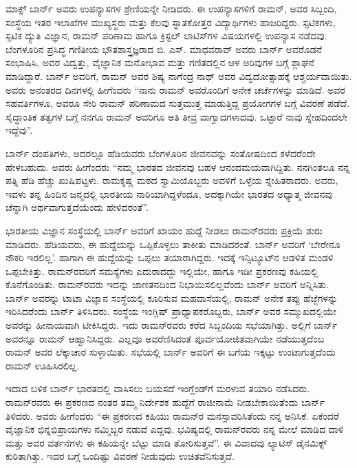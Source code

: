 ಮಾಕ್ಸ್ ಬಾರ್ನ್ ಅವರು ಉಪನ್ಯಾಸಗಳ ಶ್ರೇಣಿಯನ್ನೇ ನೀಡಿದರು. ಈ ಉಪನ್ಯಾಸಗಳಿಗೆ ರಾಮನ್, ಅವರ ಸಿಬ್ಬಂದಿ, ಸಂಸ್ಥೆಯ ಇತರ ಇಲಾಖೆಗಳ ಮುಖ್ಯಸ್ಥರು ಮತ್ತು ಕೆಲವು ಸ್ನಾತಕೋತ್ತರ ವಿದ್ಯಾರ್ಥಿಗಳು ಹಾಜರಿದ್ದರು. ಸ್ಫಟಿಕಗಳು, ಸ್ಫಟಿಕ ದ್ಯುತಿ ವಿಜ್ಞಾನ, ರಾಮನ್ ಪರಿಣಾಮ ಹಾಗೂ ಕ್ರಿಸ್ಟಲ್ ಲಾಟಿಸ್‍ಗಳ ವಿಷಯಗಳಲ್ಲಿ ಉಪನ್ಯಾಸ ನಡೆದವು. ಬೆಂಗಳೂರಿನ ಪ್ರಸಿದ್ಧ ಗಣಿತೀಯ ಭೌತಶಾಸ್ತ್ರಜ್ಞರಾದ ಬಿ. ಎಸ್. ಮಾಧವರಾವ್ ಅವರು ಬಾರ್ನ್ ಅವರೊಡನೆ ಸಂಭಾಷಿಸಿ, ಅವರ ವಿದ್ವತ್ತು, ವೈಜ್ಞಾನಿಕ ಮನೋಭಾವ ಮತ್ತು ಗಣಿತದಲ್ಲಿನ ಆಳ ಅರಿವುಗಳ ಬಗ್ಗೆ ಶ್ಲಾಘನೆ ಮಾಡಿದ್ದಾರೆ. ಬಾರ್ನ್ ಅವರಿಗೆ, ರಾಮನ್ ಅವರ ಶಿಷ್ಯ ನಾಗೆಂದ್ರ ನಾಥ್ ಅವರ ವಿದ್ವದೋತ್ಸಾಹಕ್ಕೆ ಆಶ್ಚರ್ಯವಾಯಿತು. ಅವರು ಅನಂತರದ ದಿನಗಳಲ್ಲಿ ಹೀಗೆಂದರು\enginline{-} “ನಾನು ರಾಮನ್ ಅವರೊಂದಿಗೆ ಅನೇಕ ಚರ್ಚೆಗಳನ್ನು ಮಾಡಿದೆ. ಅವರ ಸಹವರ್ತಿಗಳೂ, ಅವರೂ ಸೇರಿ ರಾಮನ್ ಪರಿಣಾಮದ ಸುತ್ತಮುತ್ತ ಮಾಡುತ್ತಿದ್ದ ಪ್ರಯೋಗಗಳ ಬಗ್ಗೆ ವಿವರಣೆ ಪಡೆದೆ. ಸೈದ್ಧಾಂತಿಕ ತತ್ವಗಳ ಬಗ್ಗೆ ನನಗೂ ರಾಮನ್ ಅವರಿಗೂ ಅತಿ ತೀವ್ರ ವಾಗ್ವಾದಗಳಾದವು. ಒಟ್ಟಾರೆ ನಾವು ಸ್ನೇಹದಿಂದಲೇ ಇದ್ದೆವು”.

ಬಾರ್ನ್ ದಂಪತಿಗಳು, ಅದರಲ್ಲೂ ಹೆಡಿಯವರು ಬೆಂಗಳೂರಿನ ಜೀವನವನ್ನು ಸಂತೋಷದಿಂದ ಕಳೆದರೆಂದೇ ಹೇಳಬಹುದು. ಅವರು ಹೀಗೆಂದರು\enginline{-} “ನಮ್ಮ ಭಾರತದ ಜೀವನವು ಬಹಳ ಆನಂದಮಯವಾಗಿದ್ದಿತು. ನನಗಿಂತಲೂ ನನ್ನ ಪತ್ನಿ ಹೆಡಿ ಹೆಚ್ಚು ಖುಷಿಪಟ್ಟಳು. ರಾಮಕೃಷ್ಣ ಮಠದ ಸ್ವಾಮಿಯೊಬ್ಬರು ಅವಳಿಗೆ ಒಳ್ಳೆಯ ಸ್ನೇಹಿತರಾದರು. ಅವರು, ಇವಳು ತನ್ನ ಹಿಂದಿನ ಜನ್ಮದಲ್ಲಿ ಭಾರತೀಯ ನಾರಿಯಾಗಿದ್ದಳೆಂದೂ, ಅದಕ್ಕಾಗಿಯೇ ಭಾರತದ ಅಧ್ಯಾತ್ಮ ಜೀವನವು ಚೆನ್ನಾಗಿ ಅರ್ಥವಾಗುತ್ತದೆಯೆಂದು ಹೇಳಿದರಂತೆ”.

ಭಾರತೀಯ ವಿಜ್ಞಾನ ಸಂಸ್ಥೆಯಲ್ಲಿ ಬಾರ್ನ್ ಅವರಿಗೆ ಖಾಯಂ ಹುದ್ದೆ ನೀಡಲು ರಾಮನ್‍ರವರು ಪ್ರಕ್ರಿಯೆ ಶುರು ಮಾಡಿದರು. ಹೆಡಿಯವರು, ಈ ಹುದ್ದೆಯನ್ನು ಒಪ್ಪಿಕೊಳ್ಳಲು ತಾಕೀತು ಮಾಡಿದರಂತೆ. ಬಾರ್ನ್ ಅವರಿಗೆ ‘ಬೇರೇನೂ ನೌಕರಿ ಇರಲಿಲ್ಲ’. ಹಾಗಾಗಿ ಈ ಹುದ್ದೆಯನ್ನು ಒಪ್ಪಲು ತಯಾರಾಗಿದ್ದರು. ಇದಕ್ಕೆ ಇನ್ಸಿಟ್ಯೂಟ್‍ನ ಆಡಳಿತ ಮಂಡಳಿ ಒಪ್ಪಬೇಕಿತ್ತು. ರಾಮನ್‍ರವರಿಗೆ ಸಮಸ್ಯೆಗಳು ಎದುರಾದದ್ದು ಇಲ್ಲಿಯೇ, ಹಾಗೂ ಇಡೀ ಪ್ರಕರಣವು ಕಹಿಯಲ್ಲಿ ಕೊನೆಗೊಂಡಿತು. ರಾಮನ್‍ರವರು ಇದನ್ನು ಜಾಣತನದಿಂದ ನಿಭಾಯಿಸಲಿಲ್ಲವೆಂದು ಬಾರ್ನ್ ಅವರಿಗೆ ಅನ್ನಿಸಿತು. ಬಾರ್ನ್ ಅವರನ್ನು ಟಾಟಾ ವಿಜ್ಞಾನ ಸಂಸ್ಥೆಯಲ್ಲಿ ಕೂರಿಸುವ ಮಹದಾಸೆಯಲ್ಲಿ, ರಾಮನ್ ಅನೇಕ ತಪ್ಪು ಹೆಜ್ಜೆಗಳನ್ನು ಇರಿಸಿದರೆಂದು ಬಾರ್ನ್ ತಿಳಿಸಿದರು. ಸಂಸ್ಥೆಯ ಇಂಗ್ಲಿಷ್ ಪ್ರಾಧ್ಯಾಪಕರೊಬ್ಬರು, ಬಾರ್ನ್ ಅವರ ಸಮ್ಮುಖದಲ್ಲಿಯೇ ಅವರನ್ನು ಹೀನಾಯವಾಗಿ ಟೀಕಿಸಿದ್ದರು. ಇದು ರಾಮನ್‍ರವರು ಕರೆದ ಸಿಬ್ಬಂದಿಯ ಸಭೆಯಾಗಿತ್ತು. ಅಲ್ಲಿಗೆ ಬಾರ್ನ್ ಅವರನ್ನೂ ರಾಮನ್ ಆಹ್ವಾನಿಸಿದ್ದರು. ಎಲ್ಲವೂ ಅವರೆಣಿಸಿದಂತೆ ಪೂರ್ವಯೋಜಿತವಾಗಿಯೇ ನಡೆಯುತ್ತದೆಂಬ ರಾಮನ್ ಅವರ ಲೆಕ್ಕಾಚಾರ ಸುಳ್ಳಾಯಿತು. ಸಭೆಯಲ್ಲಿ ಬಾರ್ನ್ ಅವರಿಗೆ ಈ ಬಗೆಯ ಇಕ್ಕಟ್ಟು ಉಂಟಾಗುತ್ತದೆಂದು ರಾಮನ್ ಊಹಿಸಿರಲಿಲ್ಲ.

ಇದಾದ ಬಳಿಕ ಬಾರ್ನ್ ಭಾರತದಲ್ಲಿ ವಾಸಿಸಲು ಬಯಸದೆ ಇಂಗ್ಲೆಂಡ್‍ಗೆ ಮರಳುವ ತಯಾರಿ ನಡೆಸಿದರು. ರಾಮನ್‍ರವರು ಈ ಪ್ರಕರಣದ ನಂತರ ತಮ್ಮ ನಿರ್ದೇಶಕ ಹುದ್ದೆಗೆ ರಾಜೀನಾಮೆ ನೀಡಬೇಕಾಯಿತೆಂದು ಬಾರ್ನ್ ತಿಳಿದರು. ಅವರು ಹೀಗೆಂದರು\enginline{-} “ಈ ಪ್ರಕರಣದ ಕಹಿಯು ರಾಮನ್‍ರ ಮನಸ್ಸಾವರಿಸಿತೆಂದು ನನ್ನ ಅನಿಸಿಕೆ. ಏಕೆಂದರೆ ವೈಜ್ಞಾನಿಕ ಭಿನ್ನಭಿಪ್ರಾಯಗಳು ನಮ್ಮಿಬ್ಬರ ನಡುವೆ ಎದ್ದವು. ಭವಿಷ್ಯದಲ್ಲಿ ರಾಮನ್‍ರವರು ನನ್ನ ಮೇಲೆ ಮಾಡಿದ ದಾಳಿ ಮತ್ತು ಅವರ ವರ್ತನೆಗಳು ಈ ಕಹಿಯನ್ನೇ ಬೆಟ್ಟು ಮಾಡಿ ತೋರಿಸುತ್ತವೆ”. ಈ ವಿವಾದವು ಲ್ಯಾಟಿಸ್ ಡೈನಮಿಕ್ಸ್ ಕುರಿತಾಗಿತ್ತು. ಇದರ ಬಗ್ಗೆ ಒಂದಿಷ್ಟು ವಿವರಣೆ ನೀಡುವುದು ಉಚಿತವೆನಿಸುತ್ತದೆ.


